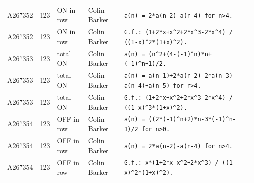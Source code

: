 \documentclass[11pt]{article}
\theoremstyle{definition}
\theoremstyle{remark}
\begin{document}
{\begin{longtable}{p{1.3cm}p{0.7cm}p{2.4cm}p{2.3cm}p{7.3cm}}
A267352 & 123 & ON in row & Colin Barker & \texttt{a(n)\allowbreak{} \allowbreak{}=\allowbreak{} \allowbreak{}2*\allowbreak{}a(n-\allowbreak{}2)\allowbreak{}-\allowbreak{}a(n-\allowbreak{}4)\allowbreak{} \allowbreak{}for \allowbreak{}n>4.} \\
A267352 & 123 & ON in row & Colin Barker & \texttt{G.f.: \allowbreak{}(1+\allowbreak{}2*\allowbreak{}x+\allowbreak{}x\^{}2+\allowbreak{}2*\allowbreak{}x\^{}3-\allowbreak{}2*\allowbreak{}x\^{}4)\allowbreak{} \allowbreak{}/\allowbreak{} \allowbreak{}((1-\allowbreak{}x)\allowbreak{}\^{}2*\allowbreak{}(1+\allowbreak{}x)\allowbreak{}\^{}2)\allowbreak{}.} \\
A267353 & 123 & total ON & Colin Barker & \texttt{a(n)\allowbreak{} \allowbreak{}=\allowbreak{} \allowbreak{}(n\^{}2+\allowbreak{}(4-\allowbreak{}(-\allowbreak{}1)\allowbreak{}\^{}n)\allowbreak{}*\allowbreak{}n+\allowbreak{}(-\allowbreak{}1)\allowbreak{}\^{}n+\allowbreak{}1)\allowbreak{}/\allowbreak{}2.} \\
A267353 & 123 & total ON & Colin Barker & \texttt{a(n)\allowbreak{} \allowbreak{}=\allowbreak{} \allowbreak{}a(n-\allowbreak{}1)\allowbreak{}+\allowbreak{}2*\allowbreak{}a(n-\allowbreak{}2)\allowbreak{}-\allowbreak{}2*\allowbreak{}a(n-\allowbreak{}3)\allowbreak{}-\allowbreak{}a(n-\allowbreak{}4)\allowbreak{}+\allowbreak{}a(n-\allowbreak{}5)\allowbreak{} \allowbreak{}for \allowbreak{}n>4.} \\
A267353 & 123 & total ON & Colin Barker & \texttt{G.f.: \allowbreak{}(1+\allowbreak{}2*\allowbreak{}x+\allowbreak{}x\^{}2+\allowbreak{}2*\allowbreak{}x\^{}3-\allowbreak{}2*\allowbreak{}x\^{}4)\allowbreak{} \allowbreak{}/\allowbreak{} \allowbreak{}((1-\allowbreak{}x)\allowbreak{}\^{}3*\allowbreak{}(1+\allowbreak{}x)\allowbreak{}\^{}2)\allowbreak{}.} \\
A267354 & 123 & OFF in row & Colin Barker & \texttt{a(n)\allowbreak{} \allowbreak{}=\allowbreak{} \allowbreak{}((2*\allowbreak{}(-\allowbreak{}1)\allowbreak{}\^{}n+\allowbreak{}2)\allowbreak{}*\allowbreak{}n-\allowbreak{}3*\allowbreak{}(-\allowbreak{}1)\allowbreak{}\^{}n-\allowbreak{}1)\allowbreak{}/\allowbreak{}2 \allowbreak{}for \allowbreak{}n>0.} \\
A267354 & 123 & OFF in row & Colin Barker & \texttt{a(n)\allowbreak{} \allowbreak{}=\allowbreak{} \allowbreak{}2*\allowbreak{}a(n-\allowbreak{}2)\allowbreak{}-\allowbreak{}a(n-\allowbreak{}4)\allowbreak{} \allowbreak{}for \allowbreak{}n>4.} \\
A267354 & 123 & OFF in row & Colin Barker & \texttt{G.f.: \allowbreak{}x*\allowbreak{}(1+\allowbreak{}2*\allowbreak{}x-\allowbreak{}x\^{}2+\allowbreak{}2*\allowbreak{}x\^{}3)\allowbreak{} \allowbreak{}/\allowbreak{} \allowbreak{}((1-\allowbreak{}x)\allowbreak{}\^{}2*\allowbreak{}(1+\allowbreak{}x)\allowbreak{}\^{}2)\allowbreak{}.} \\

\end{longtable}}
\end{document}
